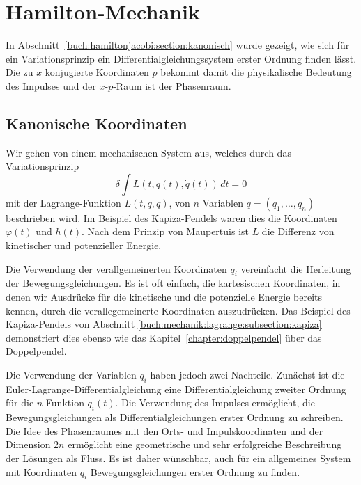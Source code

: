 %
%
%
\section{Hamilton-Mechanik
\label{buch:mechanik:section:hamilton}}
In Abschnitt~\ref{buch:hamiltonjacobi:section:kanonisch} wurde gezeigt,
wie sich für ein Variationsprinzip ein Differentialgleichungssystem
erster Ordnung finden lässt.
Die zu $x$ konjugierte Koordinaten $p$ bekommt damit die physikalische
Bedeutung des Impulses und der $x$-$p$-Raum ist der Phasenraum.

%
%
\subsection{Kanonische Koordinaten}
Wir gehen von einem mechanischen System aus, welches durch das
Variationsprinzip 
\begin{equation}
\delta
\int
L(t, q(t), \dot{q}(t))\,dt
=
0
\label{buch:mechanik:hamilton:eqn:variation}
\end{equation}
mit der Lagrange-Funktion $L(t,q,\dot{q})$, von $n$ Variablen
$q=(q_1,\dots,q_n)$ beschrieben wird.
Im Beispiel des Kapiza-Pendels waren dies die Koordinaten $\varphi(t)$
und $h(t)$.
%
Nach dem Prinzip von Maupertuis ist $L$ die Differenz von kinetischer
%
und potenzieller Energie.

Die Verwendung der verallgemeinerten Koordinaten $q_i$ vereinfacht
die Herleitung der Bewegungsgleichungen.
Es ist oft einfach, die kartesischen Koordinaten, in denen wir Ausdrücke
für die kinetische und die potenzielle Energie bereits kennen, durch
die verallegemeinerte Koordinaten auszudrücken.
Das Beispiel des Kapiza-Pendels von
Abschnitt \ref{buch:mechanik:lagrange:subsection:kapiza}
demonstriert dies ebenso wie das Kapitel~\ref{chapter:doppelpendel}
über das Doppelpendel.
%

Die Verwendung der Variablen $q_i$ haben jedoch zwei Nachteile.
Zunächst ist die Euler-Lagrange-Differentialgleichung eine
Differentialgleichung zweiter Ordnung für die $n$ Funktion 
$q_i(t)$.
Die Verwendung des Impulses ermöglicht, die Bewegungsgleichungen
als Differentialgleichungen erster Ordnung zu schreiben.
Die Idee des Phasenraumes mit den Orts- und Impulskoordinaten
und der Dimension $2n$ ermöglicht eine geometrische und sehr erfolgreiche
Beschreibung der Lösungen als Fluss.
Es ist daher wünschbar, auch für ein allgemeines System mit Koordinaten
$q_i$ Bewegungsgleichungen erster Ordnung zu finden.


